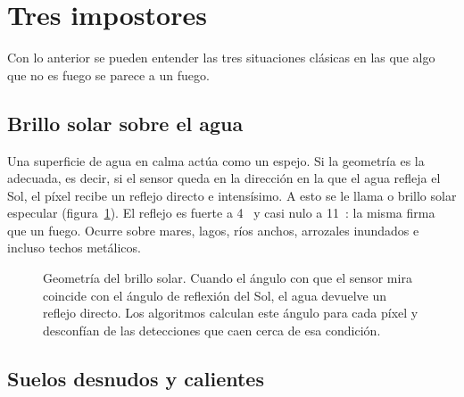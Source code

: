 \section{Tres impostores}

Con lo anterior se pueden entender las tres situaciones clásicas en las que algo que no es fuego
se parece a un fuego.

\subsection{Brillo solar sobre el agua}

Una superficie de agua en calma actúa como un espejo. Si la geometría es la adecuada, es decir,
si el sensor queda en la dirección en la que el agua refleja el Sol, el píxel recibe un reflejo
directo e intensísimo. A esto se le llama  o brillo solar especular
(figura~\ref{fig:glint}). El reflejo es fuerte a 4~\um{} y casi nulo a 11~\um: la misma firma
que un fuego. Ocurre sobre mares, lagos, ríos anchos, arrozales inundados e incluso techos
metálicos.

\begin{figure}[ht]
\centering
{}
\caption{Geometría del brillo solar. Cuando el ángulo con que el sensor mira coincide con el
ángulo de reflexión del Sol, el agua devuelve un reflejo directo. Los algoritmos calculan este
ángulo para cada píxel y desconfían de las detecciones que caen cerca de esa condición.}
\label{fig:glint}
\end{figure}

\subsection{Suelos desnudos y calientes}

